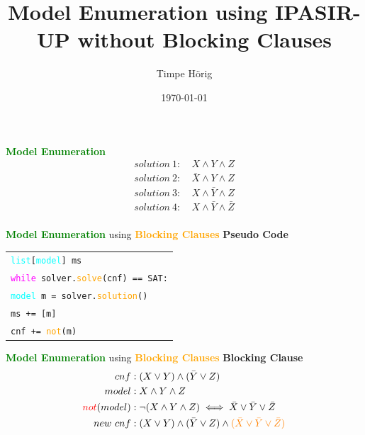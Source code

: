 \documentclass{beamer}
\title[CaDiCAll]{\textbf{Model Enumeration using IPASIR-UP without Blocking Clauses}}
\author{Timpe Hörig}
\date{\today}
\begin{document}
\begin{frame}
  \titlepage
\end{frame}

\begin{frame}{}
\end{frame}

\begin{frame}{\textcolor{green}{\textbf{Model Enumeration}}}
  \begin{align*}
    solution \ 1: \ &X \land Y \land Z \\
    solution \ 2: \ &\bar{X} \land Y \land Z \\
    solution \ 3: \ &X \land \bar{Y} \land Z \\
    solution \ 4: \ &X \land \bar{Y} \land \bar{Z} \\
  \end{align*}
\end{frame}

\begin{frame}{\textcolor{green}{\textbf{Model Enumeration}} using \textcolor{orange}{\textbf{Blocking Clauses}}}
  \textbf{Pseudo Code}
  \begin{beamerbox}[Beispielbox]
    \begin{tabular}{l}
    \texttt{\textcolor{cyan}{list}[\textcolor{cyan}{model}] ms} \\
    \texttt{\textcolor{magenta}{while} solver.\textcolor{orange}{solve}(cnf) == SAT:}\\
    \texttt{\quad \textcolor{cyan}{model} m = solver.\textcolor{orange}{solution}()}\\
    \texttt{\quad ms += [m]}\\
    \texttt{\quad cnf += \textcolor{orange}{not}(m)}
    \end{tabular}
  \end{beamerbox}
\end{frame}

\begin{frame}{\textcolor{green}{\textbf{Model Enumeration}} using \textcolor{orange}{\textbf{Blocking Clauses}}}
  \textbf{Blocking Clause}
  \begin{align*}
  cnf&: (X \lor Y) \land (\bar{Y} \lor Z)\\
  model&: X \land Y \land Z\\
  \textcolor{red}{not}(model)&: \neg (X \land Y \land Z) \iff \bar{X} \lor \bar{Y} \lor \bar{Z}\\
  new \ cnf&: (X \lor Y) \land (\bar{Y} \lor Z) \land \textcolor{orange}{(\bar{X} \lor \bar{Y} \lor \bar{Z})}
  \end{align*}
\end{frame}
\end{document}
